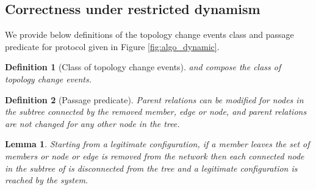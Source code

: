 \documentclass[11pt]{article}
\newtheorem{definition}{Definition}
\newtheorem{lemma}{Lemma}
\begin{document}
\subsection{Correctness under restricted dynamism}

We provide below definitions of the topology change events class  and passage predicate for protocol given in Figure \ref{fig:algo_dynamic}.


\begin{definition}[Class  of topology change events]
  and  compose the class
  of topology change events.
\end{definition}

\begin{definition}[Passage predicate]
\label{def:passage_predicate}
Parent relations can be modified for nodes in the subtree connected by
the removed member, edge or node, and parent relations are not changed
for any other node in the tree.
\end{definition}





\begin{lemma}
\label{lem:dyn_suppression}
Starting from a legitimate configuration, if a
member  leaves the set of members  or node  or edge 
is removed from the network then each connected node  in the
subtree of  is disconnected from the tree and a legitimate
configuration is reached by the system.
\end{lemma}
\end{document}

